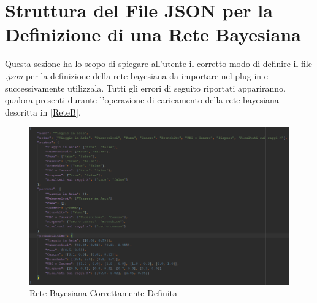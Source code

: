 \section{Struttura del File JSON per la Definizione di una Rete Bayesiana}\label{strutturaRete}

Questa sezione ha lo scopo di spiegare all'utente il corretto modo di definire il file \textit{.json} per la definizione della rete bayesiana da importare nel plug-in e successivamente utilizzala. Tutti gli errori di seguito riportati appariranno, qualora presenti durante l'operazione di caricamento della rete bayesiana descritta in \ref{ReteB}.


\begin{figure}[H]
	\begin{center}
		\includegraphics[scale=0.6]{./images/strutturaRete.png}
		 \caption{Rete Bayesiana Correttamente Definita}	
		 \label{ImgRete}
	\end{center}
\end{figure}

